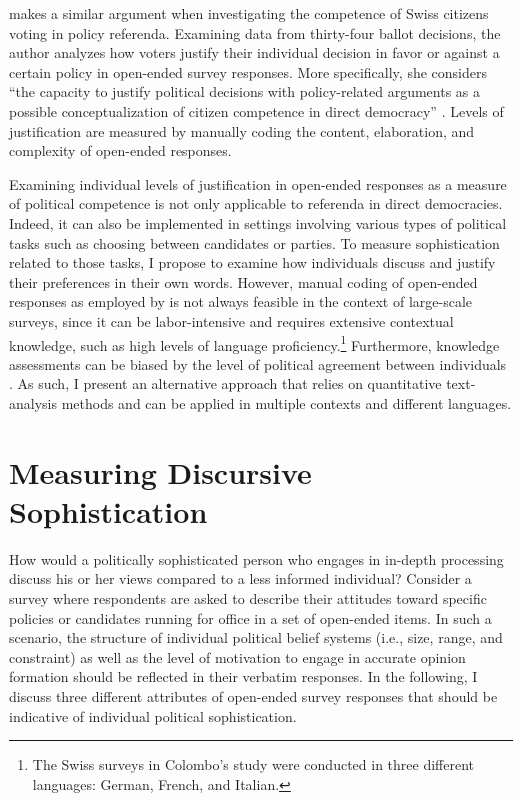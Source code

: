 \citet{colombo2016justifications} makes a similar argument when investigating the competence of Swiss citizens voting in policy referenda. Examining data from thirty-four ballot decisions, the author analyzes how voters justify their individual decision in favor or against a certain policy in open-ended survey responses. More specifically, she considers ``the capacity to justify political decisions with policy-related arguments as a possible conceptualization of citizen competence in direct democracy'' \citep[3]{colombo2016justifications}. Levels of justification are measured by manually coding the content, elaboration, and complexity of open-ended responses.

Examining individual levels of justification in open-ended responses as a measure of political competence is not only applicable to referenda in direct democracies. Indeed, it can also be implemented in settings involving various types of political tasks such as choosing between candidates or parties. To measure sophistication related to those tasks, I propose to examine how individuals discuss and justify their preferences in their own words. However, manual coding of open-ended responses as employed by \citet{colombo2016justifications} is not always feasible in the context of large-scale surveys, since it can be labor-intensive and requires extensive contextual knowledge, such as high levels of language proficiency.\footnote{The Swiss surveys in Colombo's \citeyearpar{colombo2016justifications} study were conducted in three different languages: German, French, and Italian.} Furthermore, knowledge assessments can be biased by the level of political agreement between individuals \citep{ryan2011accuracy}. As such, I present an alternative approach that relies on quantitative text-analysis methods and can be applied in multiple contexts and different languages.



\section{Measuring Discursive Sophistication}

How would a politically sophisticated person who engages in in-depth processing discuss his or her views compared to a less informed individual? Consider a survey where respondents are asked to describe their attitudes toward specific policies or candidates running for office in a set of open-ended items. In such a scenario, the structure of individual political belief systems (i.e., size, range, and constraint) as well as the level of motivation to engage in accurate opinion formation should be reflected in their verbatim responses. In the following, I discuss three different attributes of open-ended survey responses that should be indicative of individual political sophistication.

